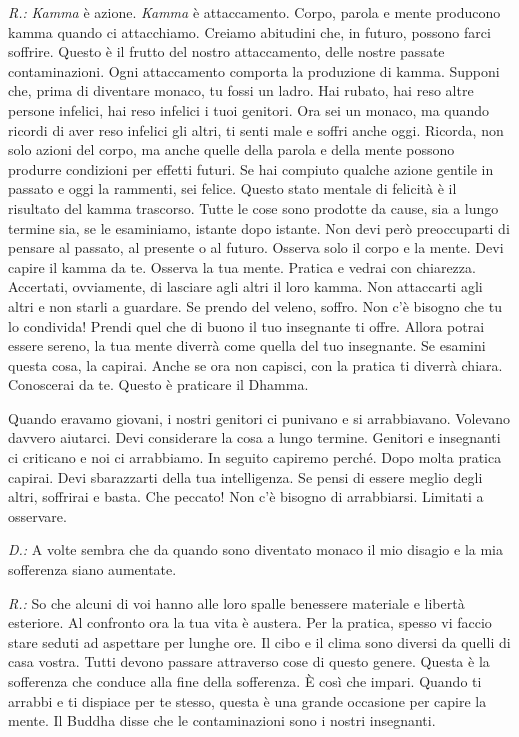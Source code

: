 \emph{R.:} \emph{Kamma} è azione. \emph{Kamma} è attaccamento. Corpo, parola e
mente producono kamma quando ci attacchiamo. Creiamo abitudini
che, in futuro, possono farci soffrire. Questo è il frutto del nostro
attaccamento, delle nostre passate contaminazioni. Ogni attaccamento
comporta la produzione di kamma. Supponi che, prima di diventare
monaco, tu fossi un ladro. Hai rubato, hai reso altre persone infelici,
hai reso infelici i tuoi genitori. Ora sei un monaco, ma quando ricordi
di aver reso infelici gli altri, ti senti male e soffri anche oggi.
Ricorda, non solo azioni del corpo, ma anche quelle della parola e della
mente possono produrre condizioni per effetti futuri. Se hai compiuto
qualche azione gentile in passato e oggi la rammenti, sei felice. Questo
stato mentale di felicità è il risultato del kamma trascorso.
Tutte le cose sono prodotte da cause, sia a lungo termine sia, se le
esaminiamo, istante dopo istante. Non devi però preoccuparti di pensare
al passato, al presente o al futuro. Osserva solo il corpo e la mente.
Devi capire il kamma da te. Osserva la tua mente. Pratica e
vedrai con chiarezza. Accertati, ovviamente, di lasciare agli altri il
loro kamma. Non attaccarti agli altri e non starli a guardare. Se
prendo del veleno, soffro. Non c'è bisogno che tu lo condivida! Prendi
quel che di buono il tuo insegnante ti offre. Allora potrai essere
sereno, la tua mente diverrà come quella del tuo insegnante. Se esamini
questa cosa, la capirai. Anche se ora non capisci, con la pratica ti
diverrà chiara. Conoscerai da te. Questo è praticare il Dhamma.

Quando eravamo giovani, i nostri genitori ci punivano e si arrabbiavano.
Volevano davvero aiutarci. Devi considerare la cosa a lungo termine.
Genitori e insegnanti ci criticano e noi ci arrabbiamo. In seguito
capiremo perché. Dopo molta pratica capirai. Devi sbarazzarti della tua
intelligenza. Se pensi di essere meglio degli altri, soffrirai e basta.
Che peccato! Non c'è bisogno di arrabbiarsi. Limitati a osservare.

\emph{D.:} A volte sembra che da quando sono diventato monaco il mio disagio e
la mia sofferenza siano aumentate.

\emph{R.:} So che alcuni di voi hanno alle loro spalle benessere materiale e
libertà esteriore. Al confronto ora la tua vita è austera. Per la
pratica, spesso vi faccio stare seduti ad aspettare per lunghe ore. Il
cibo e il clima sono diversi da quelli di casa vostra. Tutti devono
passare attraverso cose di questo genere. Questa è la sofferenza che
conduce alla fine della sofferenza. È così che impari. Quando ti arrabbi
e ti dispiace per te stesso, questa è una grande occasione per capire la
mente. Il Buddha disse che le contaminazioni sono i nostri insegnanti.

